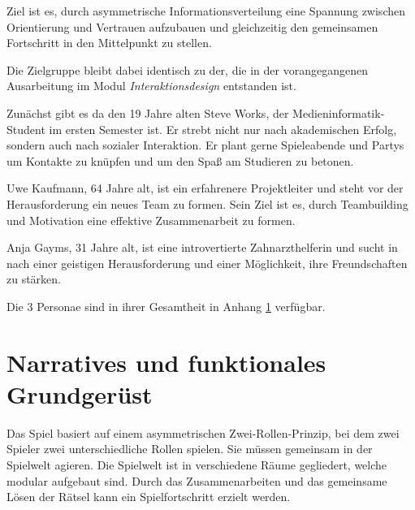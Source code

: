 Ziel ist es, durch asymmetrische Informationsverteilung eine Spannung zwischen Orientierung und Vertrauen aufzubauen und gleichzeitig den gemeinsamen Fortschritt in den Mittelpunkt zu stellen.

Die Zielgruppe bleibt dabei identisch zu der, die in der vorangegangenen Ausarbeitung im Modul \emph{Interaktionsdesign} entstanden ist.

Zunächst gibt es da den 19 Jahre alten Steve Works, der Medieninformatik-Student im ersten Semester ist. Er strebt nicht nur nach akademischen Erfolg, sondern auch nach sozialer Interaktion. Er plant gerne Spieleabende und Partys um Kontakte zu knüpfen und um den Spaß am Studieren zu betonen.

Uwe Kaufmann, 64 Jahre alt, ist ein erfahrenere Projektleiter und steht vor der Herausforderung ein neues Team zu formen. Sein Ziel ist es, durch Teambuilding und Motivation eine effektive Zusammenarbeit zu formen.

Anja Gayms, 31 Jahre alt, ist eine introvertierte Zahnarzthelferin und sucht in  nach einer geistigen Herausforderung und einer Möglichkeit, ihre Freundschaften zu stärken.

Die 3 Personae sind in ihrer Gesamtheit in Anhang \ref{} verfügbar.


\section{Narratives und funktionales Grundgerüst}
Das Spiel basiert auf einem asymmetrischen Zwei-Rollen-Prinzip, bei dem zwei Spieler zwei unterschiedliche Rollen spielen. Sie müssen gemeinsam in der Spielwelt agieren. Die Spielwelt ist in verschiedene Räume gegliedert, welche modular aufgebaut sind. Durch das Zusammenarbeiten und das gemeinsame Lösen der Rätsel kann ein Spielfortschritt erzielt werden.

